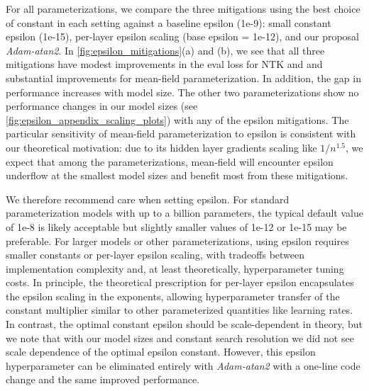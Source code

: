 \documentclass{article}
\theoremstyle{plain}
\theoremstyle{definition}
\theoremstyle{remark}
\begin{document}
For all parameterizations, we compare the three mitigations using the best choice of constant in each setting against a baseline epsilon (1e-9): small constant epsilon (1e-15), per-layer epsilon scaling (base epsilon = 1e-12), and our proposal \emph{Adam-atan2}. In \cref{fig:epsilon_mitigations}(a) and (b), we see that all three mitigations have modest improvements in the eval loss for NTK and and substantial improvements for mean-field parameterization. In addition, the gap in performance increases with model size. The other two parameterizations show no performance changes in our model sizes (see \cref{fig:epsilon_appendix_scaling_plots}) with any of the epsilon mitigations. The particular sensitivity of mean-field parameterization to epsilon is consistent with our theoretical motivation: due to its hidden layer gradients scaling like $1/n^{1.5}$, we expect that among the parameterizations, mean-field will encounter epsilon underflow at the smallest model sizes and benefit most from these mitigations.

We therefore recommend care when setting epsilon. For standard parameterization models with up to a billion parameters, the typical default value of 1e-8 is likely acceptable but slightly smaller values of 1e-12 or 1e-15 may be preferable. For larger models or other parameterizations, using epsilon requires smaller constants or per-layer epsilon scaling, with tradeoffs between implementation complexity and, at least theoretically, hyperparameter tuning costs. In principle, the theoretical prescription for per-layer epsilon encapsulates the epsilon scaling in the exponents, allowing hyperparameter transfer of the constant multiplier similar to other parameterized quantities like learning rates. In contrast, the optimal constant epsilon should be scale-dependent in theory, but we note that with our model sizes and constant search resolution we did not see scale dependence of the optimal epsilon constant. However, this epsilon hyperparameter can be eliminated entirely with \emph{Adam-atan2} with a one-line code change and the same improved performance.
\end{document}
